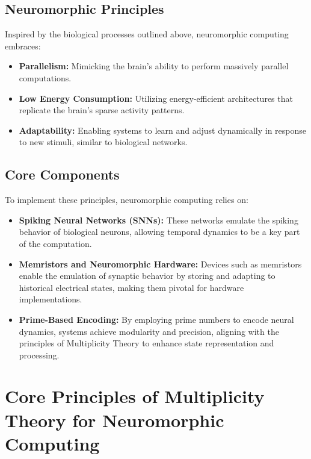 \documentclass{article}
\theoremstyle{plain}
\begin{document}
\subsection{Neuromorphic Principles}
Inspired by the biological processes outlined above, neuromorphic computing embraces:
\begin{itemize}
    \item \textbf{Parallelism:} Mimicking the brain's ability to perform massively parallel computations.
    \item \textbf{Low Energy Consumption:} Utilizing energy-efficient architectures that replicate the brain's sparse activity patterns.
    \item \textbf{Adaptability:} Enabling systems to learn and adjust dynamically in response to new stimuli, similar to biological networks.
\end{itemize}

\subsection{Core Components}
To implement these principles, neuromorphic computing relies on:
\begin{itemize}
    \item \textbf{Spiking Neural Networks (SNNs):} These networks emulate the spiking behavior of biological neurons, allowing temporal dynamics to be a key part of the computation.
    \item \textbf{Memristors and Neuromorphic Hardware:} Devices such as memristors enable the emulation of synaptic behavior by storing and adapting to historical electrical states, making them pivotal for hardware implementations.
    \item \textbf{Prime-Based Encoding:} By employing prime numbers to encode neural dynamics, systems achieve modularity and precision, aligning with the principles of Multiplicity Theory to enhance state representation and processing.
\end{itemize}

\section{Core Principles of Multiplicity Theory for Neuromorphic Computing}
\end{document}
